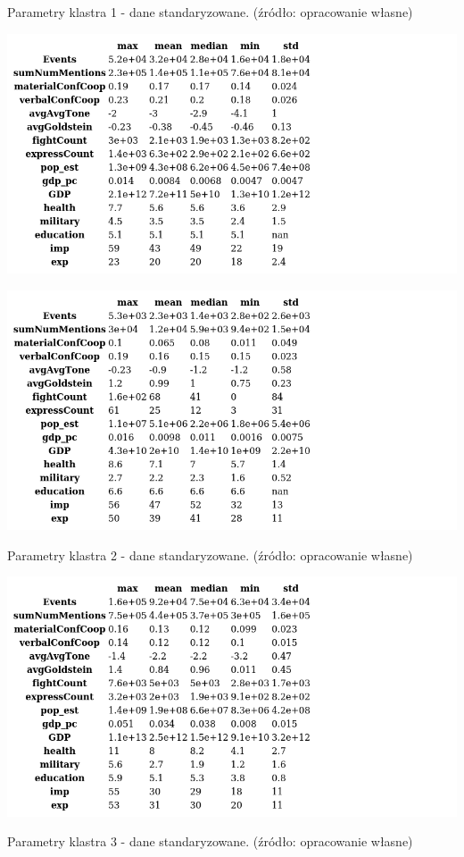 \documentclass[11pt]{report}
\begin{document}
    \begin{table}[!htp]
        \centering
        \caption{Parametry klastra 1 - dane standaryzowane. (źródło: opracowanie własne)}
        \label{tab:cl1std_desc}
        \includegraphics[width=\linewidth]{tables/CLUST/desc/clust1std_desc.png}
    \end{table}

    \begin{table}[!htp]
        \centering
        \includegraphics[width=\linewidth]{tables/CLUST/desc/clust2std_desc.png}
        \caption{Parametry klastra 2 - dane standaryzowane. (źródło: opracowanie własne)}
        \label{tab:cl2std_desc}
    \end{table}

    \begin{table}[!htp]
        \centering
        \includegraphics[width=\linewidth]{tables/CLUST/desc/clust3std_desc.png}
        \caption{Parametry klastra 3 - dane standaryzowane. (źródło: opracowanie własne)}
        \label{tab:cl3std_desc}
    \end{table}
\end{document}
